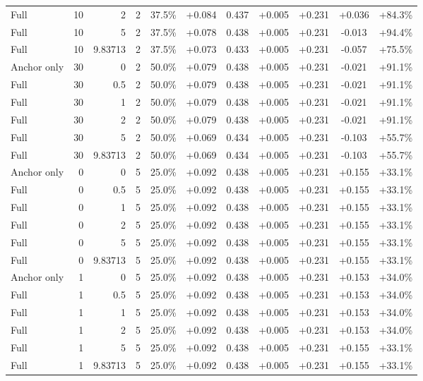 \begin{table}[htbp]
\begin{tabular}{lrrrccccccc}
Full & 10 & 2 & 2 & 37.5\% & +0.084 & 0.437 & +0.005 & +0.231 & +0.036 & +84.3\% \\
Full & 10 & 5 & 2 & 37.5\% & +0.078 & 0.438 & +0.005 & +0.231 & -0.013 & +94.4\% \\
Full & 10 & 9.83713 & 2 & 37.5\% & +0.073 & 0.433 & +0.005 & +0.231 & -0.057 & +75.5\% \\
Anchor only & 30 & 0 & 2 & 50.0\% & +0.079 & 0.438 & +0.005 & +0.231 & -0.021 & +91.1\% \\
Full & 30 & 0.5 & 2 & 50.0\% & +0.079 & 0.438 & +0.005 & +0.231 & -0.021 & +91.1\% \\
Full & 30 & 1 & 2 & 50.0\% & +0.079 & 0.438 & +0.005 & +0.231 & -0.021 & +91.1\% \\
Full & 30 & 2 & 2 & 50.0\% & +0.079 & 0.438 & +0.005 & +0.231 & -0.021 & +91.1\% \\
Full & 30 & 5 & 2 & 50.0\% & +0.069 & 0.434 & +0.005 & +0.231 & -0.103 & +55.7\% \\
Full & 30 & 9.83713 & 2 & 50.0\% & +0.069 & 0.434 & +0.005 & +0.231 & -0.103 & +55.7\% \\
Anchor only & 0 & 0 & 5 & 25.0\% & +0.092 & 0.438 & +0.005 & +0.231 & +0.155 & +33.1\% \\
Full & 0 & 0.5 & 5 & 25.0\% & +0.092 & 0.438 & +0.005 & +0.231 & +0.155 & +33.1\% \\
Full & 0 & 1 & 5 & 25.0\% & +0.092 & 0.438 & +0.005 & +0.231 & +0.155 & +33.1\% \\
Full & 0 & 2 & 5 & 25.0\% & +0.092 & 0.438 & +0.005 & +0.231 & +0.155 & +33.1\% \\
Full & 0 & 5 & 5 & 25.0\% & +0.092 & 0.438 & +0.005 & +0.231 & +0.155 & +33.1\% \\
Full & 0 & 9.83713 & 5 & 25.0\% & +0.092 & 0.438 & +0.005 & +0.231 & +0.155 & +33.1\% \\
Anchor only & 1 & 0 & 5 & 25.0\% & +0.092 & 0.438 & +0.005 & +0.231 & +0.153 & +34.0\% \\
Full & 1 & 0.5 & 5 & 25.0\% & +0.092 & 0.438 & +0.005 & +0.231 & +0.153 & +34.0\% \\
Full & 1 & 1 & 5 & 25.0\% & +0.092 & 0.438 & +0.005 & +0.231 & +0.153 & +34.0\% \\
Full & 1 & 2 & 5 & 25.0\% & +0.092 & 0.438 & +0.005 & +0.231 & +0.153 & +34.0\% \\
Full & 1 & 5 & 5 & 25.0\% & +0.092 & 0.438 & +0.005 & +0.231 & +0.155 & +33.1\% \\
Full & 1 & 9.83713 & 5 & 25.0\% & +0.092 & 0.438 & +0.005 & +0.231 & +0.155 & +33.1\% \\

\end{tabular}
\end{table}
